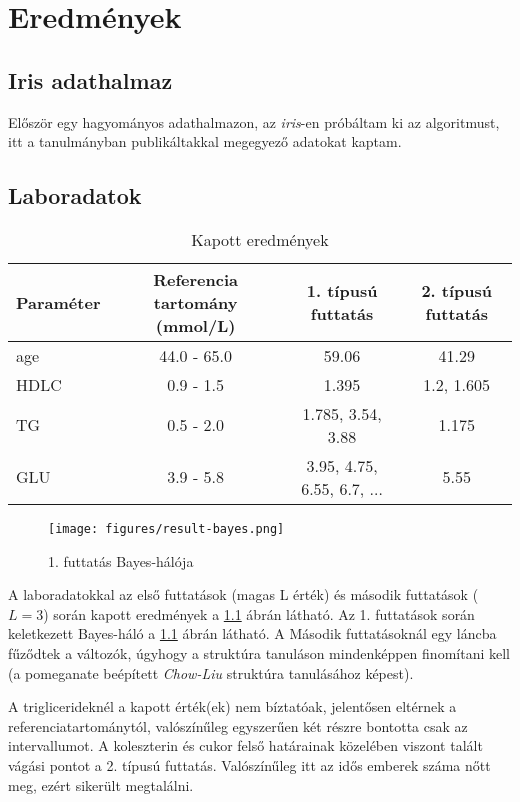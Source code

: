 \chapter{Eredmények}

\section{Iris adathalmaz}
Először egy hagyományos adathalmazon, az \emph{iris}-en próbáltam ki az algoritmust, itt a tanulmányban publikáltakkal megegyező adatokat kaptam.

\section{Laboradatok}
\begin{table}[]
\begin{tabular}{lccc}
Paraméter & Referencia tartomány (mmol/L) & 1. típusú futtatás & 2. típusú futtatás \\
\hline
age  & 44.0 - 65.0 & 59.06                         & 41.29\\
HDLC & 0.9 - 1.5   & 1.395                         & 1.2, 1.605\\
TG  & 0.5 - 2.0   & 1.785, 3.54, 3.88             & 1.175\\
GLU   & 3.9 - 5.8   & 3.95, 4.75, 6.55, 6.7, $\dotsc$ & 5.55
\end{tabular}
\caption{Kapott eredmények}
\label{tab:eredmenyek}
\end{table}

\begin{figure}[htp]
    \centering
    \texttt{[image: figures/result-bayes.png]}
    \caption{1. futtatás Bayes-hálója}
    \label{fig:result-bayes}
\end{figure}

A laboradatokkal az első futtatások (magas L érték) és második futtatások ($L = 3$) során kapott eredmények a \ref{tab:eredmenyek} ábrán látható. Az 1. futtatások során keletkezett Bayes-háló a \ref{fig:result-bayes} ábrán látható. A Második futtatásoknál egy láncba fűződtek a változók, úgyhogy a struktúra tanuláson mindenképpen finomítani kell (a pomeganate beépített \emph{Chow-Liu} struktúra tanulásához képest).

A triglicerideknél a kapott érték(ek) nem bíztatóak, jelentősen eltérnek a referenciatartománytól, valószínűleg egyszerűen két részre bontotta csak az intervallumot. A koleszterin és cukor felső határainak közelében viszont talált vágási pontot a 2. típusú futtatás. Valószínűleg itt az idős emberek száma nőtt meg, ezért sikerült megtalálni.

